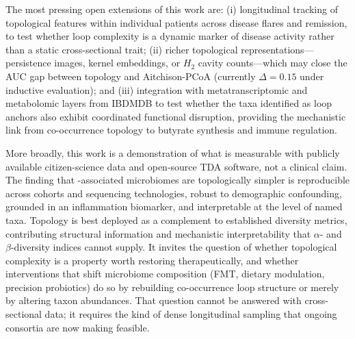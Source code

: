 The most pressing open extensions of this work are:
(i) longitudinal tracking of topological features within individual patients
across disease flares and remission, to test whether loop complexity is a
dynamic marker of disease activity rather than a static cross-sectional
trait;
(ii) richer topological representations---persistence images, kernel
embeddings, or $H_2$ cavity counts---which may close the AUC gap between
topology and Aitchison-PCoA (currently $\Delta = 0.15$ under inductive
evaluation);
and (iii) integration with metatranscriptomic and metabolomic layers from
IBDMDB to test whether the taxa identified as loop anchors also exhibit
coordinated functional disruption, providing the mechanistic link from
co-occurrence topology to butyrate synthesis and immune regulation.

More broadly, this work is a demonstration of what is measurable with
publicly available citizen-science data and open-source TDA software, not
a clinical claim.
The finding that \ibd-associated microbiomes are topologically simpler is
reproducible across cohorts and sequencing technologies, robust to
demographic confounding, grounded in an inflammation biomarker, and
interpretable at the level of named taxa.
Topology is best deployed as a complement to established diversity metrics,
contributing structural information and mechanistic interpretability that
$\alpha$- and $\beta$-diversity indices cannot supply.
It invites the question of whether topological complexity is a property
worth restoring therapeutically, and whether interventions that shift
microbiome composition (FMT, dietary modulation, precision probiotics) do
so by rebuilding co-occurrence loop structure or merely by altering
taxon abundances.
That question cannot be answered with cross-sectional data; it requires
the kind of dense longitudinal sampling that ongoing consortia are now
making feasible.
